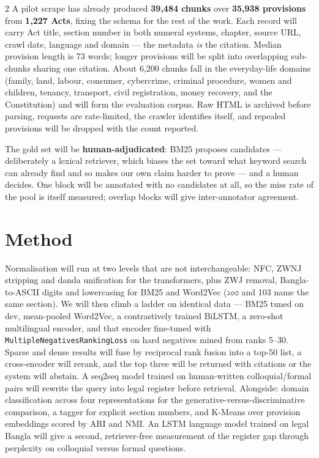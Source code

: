 \documentclass[11pt]{article}
\newcommand{\bng}[1]{{\bn #1}}
\begin{document}
\begin{multicols}{2}
\vspace{3pt}
A pilot scrape has already produced \textbf{39,484 chunks} over \textbf{35,938 provisions} from \textbf{1,227 Acts}, fixing the schema for the rest of the work. Each record will carry Act title, section number in both numeral systems, chapter, source URL, crawl date, language and domain --- the metadata \emph{is} the citation. Median provision length is 73 words; longer provisions will be split into overlapping sub-chunks sharing one citation. About 6,200 chunks fall in the everyday-life domains (family, land, labour, consumer, cybercrime, criminal procedure, women and children, tenancy, transport, civil registration, money recovery, and the Constitution) and will form the evaluation corpus. Raw HTML is archived before parsing, requests are rate-limited, the crawler identifies itself, and repealed provisions will be dropped with the count reported.

The gold set will be \textbf{human-adjudicated}: BM25 proposes candidates --- deliberately a lexical retriever, which biases the set toward what keyword search can already find and so makes our own claim harder to prove --- and a human decides. One block will be annotated with no candidates at all, so the miss rate of the pool is itself measured; overlap blocks will give inter-annotator agreement.

\section{Method}
Normalisation will run at two levels that are not interchangeable: NFC, ZWNJ stripping and danda unification for the transformers, plus ZWJ removal, Bangla-to-ASCII digits and lowercasing for BM25 and Word2Vec (\bng{১০৩} and 103 name the same section). We will then climb a ladder on identical data --- BM25 tuned on dev, mean-pooled Word2Vec, a contrastively trained BiLSTM, a zero-shot multilingual encoder, and that encoder fine-tuned with \texttt{MultipleNegativesRankingLoss} on hard negatives mined from ranks 5--30. Sparse and dense results will fuse by reciprocal rank fusion into a top-50 list, a cross-encoder will rerank, and the top three will be returned with citations or the system will abstain. A seq2seq model trained on human-written colloquial/formal pairs will rewrite the query into legal register before retrieval. Alongside: domain classification across four representations for the generative-versus-discriminative comparison, a tagger for explicit section numbers, and K-Means over provision embeddings scored by ARI and NMI. An LSTM language model trained on legal Bangla will give a second, retriever-free measurement of the register gap through perplexity on colloquial versus formal questions.


\end{multicols}
\end{document}
